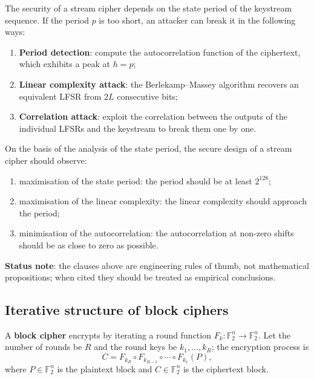 \begin{definition}\label{def:stream_cipher_period_attack}
The security of a stream cipher depends on the state period of the keystream sequence. If the period \(p\) is too short, an attacker can break it in the following ways:
\begin{enumerate}[label=(\roman*)]
    \item \textbf{Period detection}: compute the autocorrelation function of the ciphertext, which exhibits a peak at \(h=p\);
    \item \textbf{Linear complexity attack}: the Berlekamp--Massey algorithm recovers an equivalent LFSR from \(2L\) consecutive bits;
    \item \textbf{Correlation attack}: exploit the correlation between the outputs of the individual LFSRs and the keystream to break them one by one.
\end{enumerate}
\end{definition}

\begin{remark}\label{prop:stream_cipher_security}
On the basis of the analysis of the state period, the secure design of a stream cipher should observe:
\begin{enumerate}[label=(\roman*)]
    \item maximisation of the state period: the period should be at least \(2^{128}\);
    \item maximisation of the linear complexity: the linear complexity should approach the period;
    \item minimisation of the autocorrelation: the autocorrelation at non-zero shifts should be as close to zero as possible.
\end{enumerate}
\textbf{Status note}: the clauses above are engineering rules of thumb, not mathematical propositions; when cited they should be treated as empirical conclusions.
\end{remark}

\subsection{Iterative structure of block ciphers}

\begin{definition}\label{def:block_cipher_round_function}
A \textbf{block cipher} encrypts by iterating a round function \(F_k:\mathbb F_2^n\to\mathbb F_2^n\). Let the number of rounds be \(R\) and the round keys be \(k_1,\dots,k_R\); the encryption process is
\[
C=F_{k_R}\circ F_{k_{R-1}}\circ\cdots\circ F_{k_1}(P),
\]
where \(P\in\mathbb F_2^n\) is the plaintext block and \(C\in\mathbb F_2^n\) is the ciphertext block.
\end{definition}

